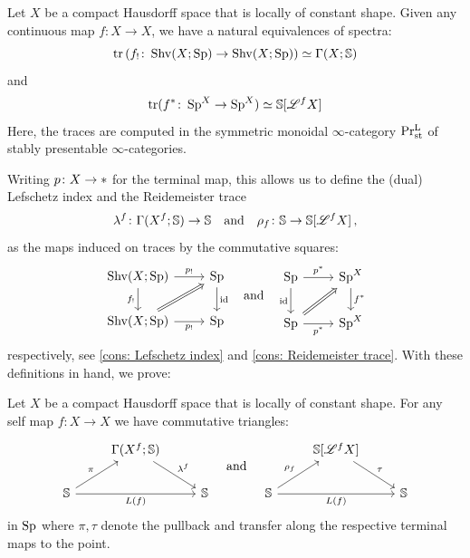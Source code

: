 \begin{prop}
 Let $X$ be a compact Hausdorff space that is locally of constant shape.
 Given any continuous map $f\colon X\to X$, we have a natural equivalences of spectra:
 \[ \mathrm{tr}\left(f_!\colon \operatorname{Shv}(X;\operatorname{Sp}) \to \operatorname{Shv}(X;\operatorname{Sp})\right)\simeq \Gamma(X;\mathbb{S})\]
 and
 \[ \mathrm{tr}(f^* \colon \operatorname{Sp}^X \to \operatorname{Sp}^X)\simeq \mathbb{S}[\mathscr{L}^f X]\]
 Here, the traces are computed in the symmetric
 monoidal $\infty$-category $\operatorname{Pr^L_{st}}$ of stably presentable $\infty$-categories.
\end{prop}

Writing $p\colon X\to \ast$ for the terminal map,
this allows us to define the (dual) Lefschetz index and the Reidemeister trace 
\[ \lambda^f\colon \Gamma(X^f;\mathbb{S})\to \mathbb{S} \quad \text{and} \quad \rho_f\colon \mathbb{S} \to \mathbb{S}[\mathscr{L}^f X]\,,\]
as the maps induced on traces by the commutative squares:
\[
\begin{tikzcd}
  {\Shv(X;\Sp)} & {\Sp} \\
  {\Shv(X;\Sp)} & {\Sp}
	\arrow["{p_!}", from=1-1, to=1-2]
	\arrow["{f_!}"', from=1-1, to=2-1]
	\arrow["\id", from=1-2, to=2-2]
	\arrow[Rightarrow, from=2-1, to=1-2]
	\arrow["{p_!}"', from=2-1, to=2-2]
\end{tikzcd} 
\quad \text{and}\quad
\begin{tikzcd}
	{\Sp} & {\Sp^X} \\
  {\Sp} & {\Sp^X}
	\arrow["{p^{*}}", from=1-1, to=1-2]
	\arrow["{\id}"', from=1-1, to=2-1]
	\arrow["f^*", from=1-2, to=2-2]
	\arrow[Rightarrow, from=2-1, to=1-2]
	\arrow["{p^*}"', from=2-1, to=2-2]
\end{tikzcd}
\]
respectively, see \cref{cons: Lefschetz index} and 
\cref{cons: Reidemeister trace}. 
With these definitions in hand, we prove:
\begin{thm}
 Let $X$ be a compact Hausdorff space that is locally of constant shape. For any 
 self map $f\colon X\to X$ we have commutative triangles:
\[
\begin{tikzcd}
	{} & {\Gamma(X^f;\SS}) & \\
	{\SS} && {\SS}
	\arrow["{\lambda^f}", from=1-2, to=2-3]
  \arrow["\pi", from=2-1, to=1-2]
	\arrow["{L(f)}"', from=2-1, to=2-3]
\end{tikzcd}
\quad \text{and} \quad
\begin{tikzcd}
  {} & {\SS[\cL^fX]} & \\
  {\SS} && {\SS}
  \arrow["{\tau}", from=1-2, to=2-3]
\arrow["{\rho_f}", from=2-1, to=1-2]
  \arrow["{L(f)}"', from=2-1, to=2-3]
\end{tikzcd}
\]
in $\operatorname{Sp}$ where $\pi,\tau$ denote the pullback and transfer along the respective
terminal maps to the point.
\end{thm}

